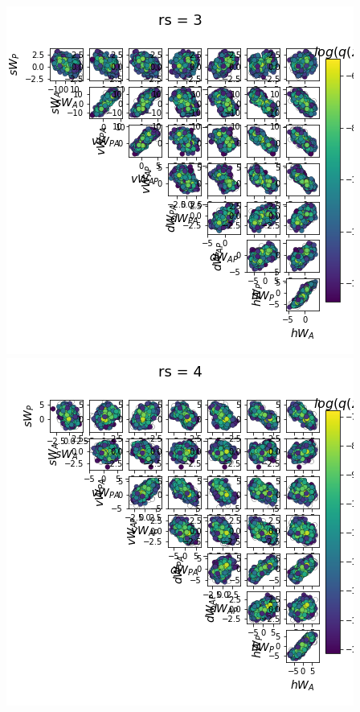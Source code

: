 \documentclass[11pt]{article}
\begin{document}
\begin{center}
\includegraphics[scale=0.33]{figs/Z_SC_pvar_full_c=0_p=80_rs=3.png} \\
\includegraphics[scale=0.33]{figs/Z_SC_pvar_full_c=0_p=80_rs=4.png}

\end{center}
\end{document}
